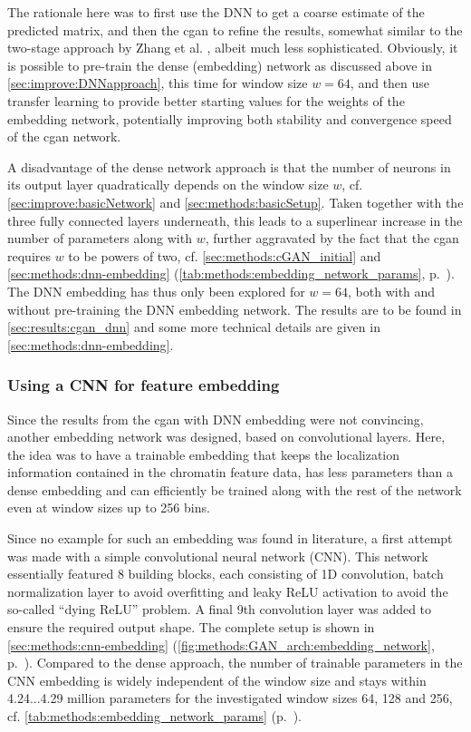 The rationale here was to first use the DNN to get a coarse estimate of the predicted matrix,
and then the \acrshort{cgan} to refine the results, somewhat similar to the two-stage approach by Zhang et al. \cite{Zhang2019c},
albeit much less sophisticated. 
Obviously, it is possible to pre-train the dense (embedding) network as discussed above in \cref{sec:improve:DNNapproach}, 
this time for window size $w=64$, and then use transfer learning to provide better starting values for the weights of the embedding network, 
potentially improving both stability and convergence speed of the \acrshort{cgan} network.

A disadvantage of the dense network approach is that the number of neurons in its output layer quadratically depends on the window size $w$,
cf. \cref{sec:improve:basicNetwork} and \ref{sec:methods:basicSetup}.
Taken together with the three fully connected layers underneath, this leads to a superlinear increase in the number of parameters along with $w$,
further aggravated by the fact that the \acrshort{cgan} requires $w$ to be powers of two, cf. \cref{sec:methods:cGAN_initial} and  
\ref{sec:methods:dnn-embedding} (\cref{tab:methods:embedding_network_params}, p.~\pageref{tab:methods:embedding_network_params}).
The DNN embedding has thus only been explored for $w=64$, both with and without pre-training the DNN embedding network. 
The results are to be found in \cref{sec:results:cgan_dnn} and some more technical details are given in \cref{sec:methods:dnn-embedding}.

\subsubsection{Using a CNN for feature embedding} \label{sec:improve:CNN_embedding}
Since the results from the \acrshort{cgan} with DNN embedding were not convincing, another embedding network was designed, based on convolutional layers.
Here, the idea was to have a trainable embedding that keeps the localization information contained in the chromatin feature data,
has less parameters than a dense embedding and can efficiently be trained along with the rest of the network even at window sizes up to 256 bins.

Since no example for such an embedding was found in literature, a first attempt was made with a simple convolutional neural network (CNN).
This network essentially featured 8 building blocks, each consisting of 1D convolution, batch normalization layer to avoid overfitting and leaky ReLU activation \cite{Maas2013}
to avoid the so-called ``dying ReLU'' problem. 
A final 9th convolution layer was added to ensure the required output shape. 
The complete setup is shown in \cref{sec:methods:cnn-embedding} (\cref{fig:methods:GAN_arch:embedding_network}, p.~\pageref{fig:methods:GAN_arch:embedding_network}).
Compared to the dense approach, the number of trainable parameters in the CNN embedding is widely independent of the window size and 
stays within 4.24...4.29 million parameters for the investigated window sizes 64, 128 and 256, cf. \cref{tab:methods:embedding_network_params} (p.~\pageref{tab:methods:embedding_network_params}).

